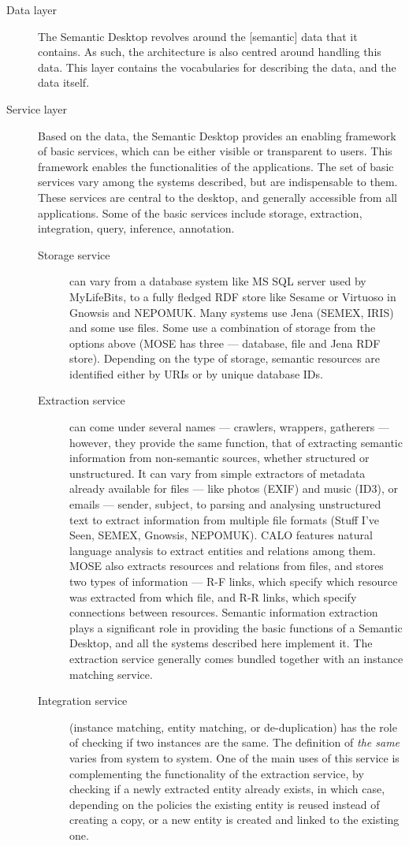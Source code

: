\begin{description}
 \item[Data layer] The Semantic Desktop revolves around the [semantic] data that it contains. As such, the architecture is also centred around handling this data. This layer contains the vocabularies for describing the data, and the data itself. 
 \item[Service layer] Based on the data, the Semantic Desktop provides an enabling framework of basic services, which can be either visible or transparent to users. This framework enables the functionalities of the applications. The set of basic services vary among the systems described, but are indispensable to them. These services are central to the desktop, and generally accessible from all applications. Some of the basic services include storage, extraction, integration, query, inference, annotation. 
\begin{description}
 \item[Storage service] can vary from a database system like MS SQL server used by MyLifeBits, to a fully fledged RDF store like Sesame or Virtuoso in Gnowsis and NEPOMUK. Many systems use Jena (SEMEX, IRIS) and some use files. Some use a combination of storage from the options above (MOSE has three --- database, file and Jena RDF store). Depending on the type of storage, semantic resources are identified either by URIs or by unique database IDs. 
 \item[Extraction service] can come under several names --- crawlers, wrappers, gatherers --- however, they provide the same function, that of extracting semantic information from non-semantic sources, whether structured or unstructured. It can vary from simple extractors of metadata already available for files --- like photos (EXIF) and music (ID3), or emails --- sender, subject, to parsing and analysing unstructured text to extract information from multiple file formats (Stuff I've Seen, SEMEX, Gnowsis, NEPOMUK). CALO features natural language analysis to extract entities and relations among them. MOSE also extracts resources and relations from files, and stores two types of information --- R-F links, which specify which resource was extracted from which file, and R-R links, which specify connections between resources. Semantic information extraction plays a significant role in providing the basic functions of a Semantic Desktop, and all the systems described here implement it. The extraction service 
generally comes bundled together with an instance matching service.
 \item[Integration service] (instance matching, entity matching, or de-duplication) has the role of checking if two instances are the same. The definition of \emph{the same} varies from system to system. One of the main uses of this service is complementing the functionality of the extraction service, by checking if a newly extracted entity already exists, in which case, depending on the policies the existing entity is reused instead of creating a copy, or a new entity is created and linked to the existing one.

\end{description}
\end{description}

